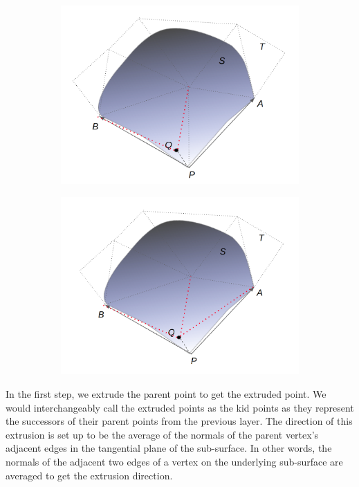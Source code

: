\begin{figure}
\begin{subfigure}{0.5\textwidth}
  \caption{}
  \label{fig-pointPlacement2}
\end{subfigure}
\begin{subfigure}{0.5\textwidth}
	\centering
	\includegraphics[width=\linewidth]{img/m1/pointInsertion.png}
	\caption{}
	\label{fig-pointPlacement3}
\end{subfigure}%
\begin{subfigure}{0.5\textwidth}
	\centering
	\includegraphics[width=\linewidth]{img/m1/localReconnection.png}
	\caption{}
	\label{fig-pointPlacement4}
\end{subfigure}
\caption{}
\label{fig-point}
\end{figure}

In the first step, we extrude the parent point to get the extruded point. We would interchangeably call the extruded points as the kid points as they represent the successors of their parent points from the previous layer. The direction of this extrusion is set up to be the average of the normals of the parent vertex's adjacent edges in the tangential plane of the sub-surface. In other words, the normals of the adjacent two edges of a vertex on the underlying sub-surface are averaged to get the extrusion direction.

